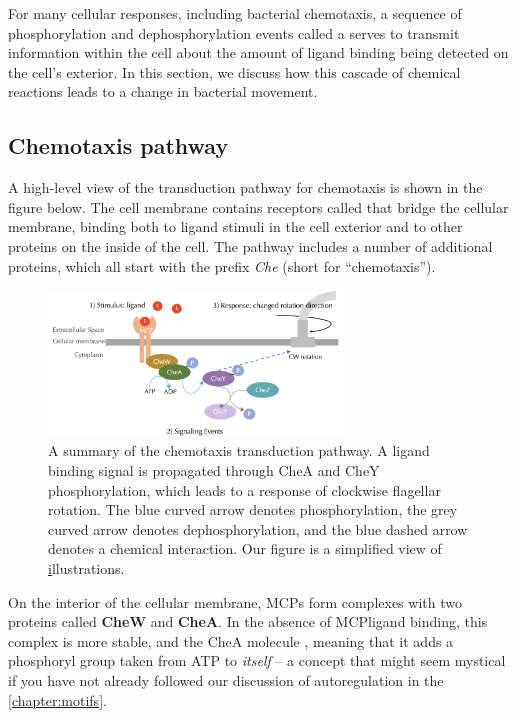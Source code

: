 For many cellular responses, including bacterial chemotaxis, a sequence of phosphorylation and dephosphorylation events called a  serves to transmit information within the cell about the amount of ligand binding being detected on the cell's exterior. In this section, we discuss how this cascade of chemical reactions leads to a change in bacterial movement.

\FloatBarrier
{}
{}
\subsection{Chemotaxis pathway}

A high-level view of the transduction pathway for chemotaxis is shown in the figure below. The cell membrane contains receptors called  that bridge the cellular membrane, binding both to ligand stimuli in the cell exterior and to other proteins on the inside of the cell. The pathway includes a number of additional proteins, which all start with the prefix \textit{Che} (short for ``chemotaxis'').

\begin{figure}[h]
\centering
\mySfFamily
\includegraphics[width = 0.7\textwidth]{../images/chemotaxisphosnew.png}
\caption{A summary of the chemotaxis transduction pathway. A ligand binding signal is propagated through CheA and CheY phosphorylation, which leads to a response of clockwise flagellar rotation. The blue curved arrow denotes phosphorylation, the grey curved arrow denotes dephosphorylation, and the blue dashed arrow denotes a chemical interaction. Our figure is a simplified view of \href{http://chemotaxis.biology.utah.edu/Parkinson_Lab/projects/ecolichemotaxis/ecolichemotaxis.html} illustrations.}
\label{fig:chemotaxisphosnew.png}
\end{figure}


On the interior of the cellular membrane, MCPs form complexes with two proteins called \textbf{CheW} and \textbf{CheA}. In the absence of MCP\-ligand binding, this complex is more stable, and the CheA molecule , meaning that it adds a phosphoryl group taken from ATP to \textit{itself} -- a concept that might seem mystical if you have not already followed our discussion of autoregulation in the \autoref{chapter:motifs}.

